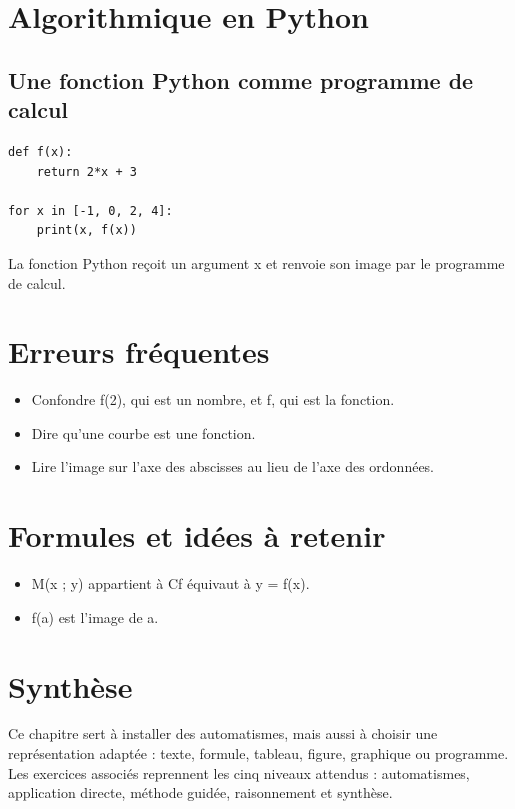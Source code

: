 
\section{Algorithmique en Python}

\subsection{Une fonction Python comme programme de calcul}

\begin{verbatim}
def f(x):
    return 2*x + 3

for x in [-1, 0, 2, 4]:
    print(x, f(x))
\end{verbatim}

La fonction Python reçoit un argument x et renvoie son image par le programme de calcul.

\section{Erreurs fréquentes}

\begin{itemize}
\item Confondre f(2), qui est un nombre, et f, qui est la fonction.
\item Dire qu'une courbe est une fonction.
\item Lire l'image sur l'axe des abscisses au lieu de l'axe des ordonnées.
\end{itemize}

\section{Formules et idées à retenir}

\begin{itemize}
\item M(x ; y) appartient à Cf équivaut à y = f(x).
\item f(a) est l'image de a.
\end{itemize}

\section{Synthèse}

Ce chapitre sert à installer des automatismes, mais aussi à choisir une représentation adaptée : texte, formule, tableau, figure, graphique ou programme. Les exercices associés reprennent les cinq niveaux attendus : automatismes, application directe, méthode guidée, raisonnement et synthèse.
